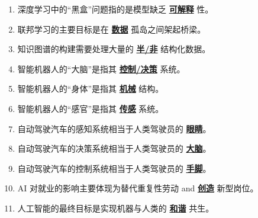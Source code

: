 \documentclass[12pt,a4paper,openany]{ctexbook}
\begin{document}
\begin{enumerate}[resume,leftmargin=2em,itemsep=1pt]
\item 深度学习中的“黑盒”问题指的是模型缺乏 \underline{\textbf{可解释}} 性。
\item 联邦学习的主要目标是在 \underline{\textbf{数据}} 孤岛之间架起桥梁。
\item 知识图谱的构建需要处理大量的 \underline{\textbf{半/非}} 结构化数据。
\item 智能机器人的“大脑”是指其 \underline{\textbf{控制/决策}} 系统。
\item 智能机器人的“身体”是指其 \underline{\textbf{机械}} 结构。
\item 智能机器人的“感官”是指其 \underline{\textbf{传感}} 系统。
\item 自动驾驶汽车的感知系统相当于人类驾驶员的 \underline{\textbf{眼睛}}。
\item 自动驾驶汽车的决策系统相当于人类驾驶员的 \underline{\textbf{大脑}}。
\item 自动驾驶汽车的控制系统相当于人类驾驶员的 \underline{\textbf{手脚}}。
\item AI 对就业的影响主要体现为替代重复性劳动 and \underline{\textbf{创造}} 新型岗位。
\item 人工智能的最终目标是实现机器与人类的 \underline{\textbf{和谐}} 共生。
\end{enumerate}
\end{document}
